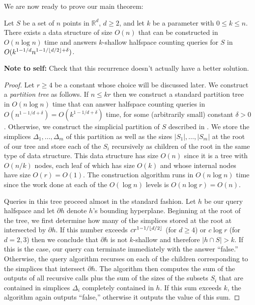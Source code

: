 \documentclass[lotsofwhite]{patmorin}
\newcommand{\X}{1-1/\floor{d/2}+\delta}
\begin{document}
We are now ready to prove our main theorem:

\begin{thm}
Let $S$ be a set of $n$ points in $\mathbb{R}^d$, $d\ge 2$, and let
$k$ be a parameter with $0\le k\le n$. There exists a data structure
of size $O(n)$ that can be constructed in $O(n\log n)$ time and
answers $k$-shallow halfspace counting queries for $S$ in
$O(k^{1-1/d}n^{\X})$.
\end{thm}
\noindent
\textbf{Note to self:} Check that this recurrence doesn't actually have
a better solution.
\begin{proof}

Let $r\ge 4$ be a constant whose choice will be discussed later.  We
construct a \emph{partition tree} \cite{X} as follows.  If $n\le kr$
then we construct a standard partition tree in $O(n\log n)$ time that
can answer halfspace counting queries in
$O(n^{1-1/d+\delta})=O(k^{1-1/d+\delta})$ time, for some (arbitrarily
small) constant $\delta>0$.  Otherwise, we construct the simplicial
partition of $S$ described in .  We store
the simplices $\Delta_1,\ldots,\Delta_m$ of this partition as well as
the sizes $|S_1|,\ldots,|S_m|$ at the root of our tree and store each
of the $S_i$ recursively as children of the root in the same type of
data structure. This data structure has size $O(n)$ since it
is a tree with $O(n/k)$ nodes, each leaf of which has size $O(k)$ and
whose internal nodes have size $O(r)=O(1)$.  The construction
algorithm runs in $O(n\log n)$ time since the work done at each of the
$O(\log n)$ levels is $O(n\log r)=O(n)$. 

Queries in this tree proceed almost in the standard fashion. Let $h$
be our query halfspace and let $\partial h$ denote $h$'s bounding
hyperplane.  Beginning at the root of the tree, we first determine how
many of the simplices stored at the root at intersected by $\partial
h$.  If this number exceeds $cr^{1-1/\left\lfloor d/2 \right\rfloor}$ (for $d\ge 4$) or $c\log r$
(for $d=2,3$) then we conclude that $\partial h$ is not $k$-shallow
and therefore $|h\cap S|>k$.  If this is the case, our query can
terminate immediately with the answer ``false.''  Otherwise, the
query algorithm recurses on each of the children corresponding to the
simplices that intersect $\partial h$.  The algorithm then computes
the sum of the outputs of all recursive calls plus the sum of the
sizes of the subsets $S_i$ that are contained in simplices $\Delta_i$
completely contained in $h$.  If this sum exceeds $k$, the algorithm
again outputs ``false,'' otherwise it outputs the value of this sum.


\end{proof}
\end{document}
